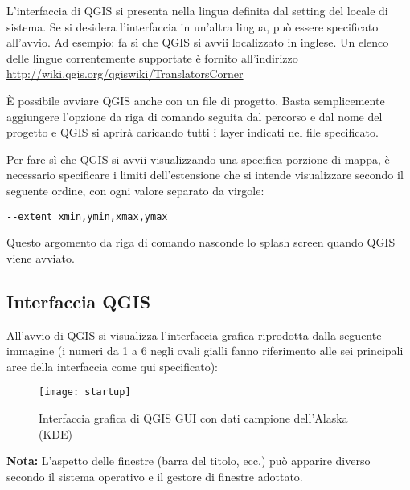 L'interfaccia di QGIS si presenta nella lingua definita dal setting del locale di sistema.
Se si desidera l'interfaccia in un'altra lingua, può essere specificato all'avvio. Ad esempio:
 fa sì che QGIS si avvii localizzato in inglese.
Un elenco delle lingue correntemente supportate è fornito all'indirizzo
\url{http://wiki.qgis.org/qgiswiki/TranslatorsCorner} 

È possibile avviare QGIS anche con un file di progetto. Basta semplicemente
aggiungere l'opzione da riga di comando  seguita dal percorso e dal nome
del progetto e QGIS si aprirà caricando tutti i layer indicati nel file specificato.

Per fare sì che QGIS si avvii visualizzando una specifica porzione di mappa, è necessario
specificare i limiti dell'estensione che si intende visualizzare secondo il seguente ordine,
con ogni valore separato da virgole:

\begin{verbatim}
--extent xmin,ymin,xmax,ymax
\end{verbatim}

Questo argomento da riga di comando nasconde lo splash screen quando QGIS viene avviato.

\subsection{Interfaccia QGIS}
\label{label_qgismainwindow}

All'avvio di QGIS si visualizza l'interfaccia grafica riprodotta dalla seguente immagine  
(i numeri da 1 a 6 negli ovali gialli fanno riferimento alle sei principali aree della
interfaccia come qui specificato):

\begin{figure}[ht]
   \begin{center}
   \caption{Interfaccia grafica di QGIS GUI con dati campione dell'Alaska \nixcaption (KDE)}
	 \label{fig:startup}
   \texttt{[image: startup]}
\end{center} 
\end{figure}

\textbf{Nota:} L'aspetto delle finestre (barra del titolo, ecc.) può apparire diverso
secondo il sistema operativo e il gestore di finestre adottato.\\

